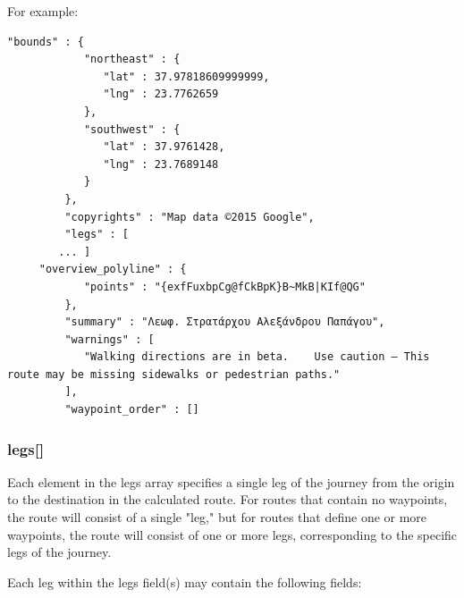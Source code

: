 For example:

\begin{lstlisting}[basicstyle=\footnotesize\ttfamily, breaklines=true]
	"bounds" : {
            "northeast" : {
               "lat" : 37.97818609999999,
               "lng" : 23.7762659
            },
            "southwest" : {
               "lat" : 37.9761428,
               "lng" : 23.7689148
            }
         },
         "copyrights" : "Map data ©2015 Google",
         "legs" : [
	    ... ]
	 "overview_polyline" : {
            "points" : "{exfFuxbpCg@fCkBpK}B~MkB|KIf@QG"
         },
         "summary" : "Λεωφ. Στρατάρχου Αλεξάνδρου Παπάγου",
         "warnings" : [
            "Walking directions are in beta.    Use caution – This route may be missing sidewalks or pedestrian paths."
         ],
         "waypoint_order" : []   
\end{lstlisting}

\subsubsection{legs[]}

Each element in the legs array specifies a single leg of the journey from the origin to the destination in the calculated route. For routes that contain 
no waypoints, the route will consist of a single "leg," but for routes that define one or more waypoints, the route will consist of one or more legs, 
corresponding to the specific legs of the journey.

Each leg within the legs field(s) may contain the following fields:

